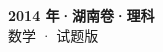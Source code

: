 \documentclass[zihao=-4, a4paper]{ctexart}
\begin{document}
\begin{center}
  {\Large\bfseries 2014 年·湖南卷·理科}\\[4pt]
  {\large 数学 · 试题版}
\end{center}
\medskip
{}

\end{document}
